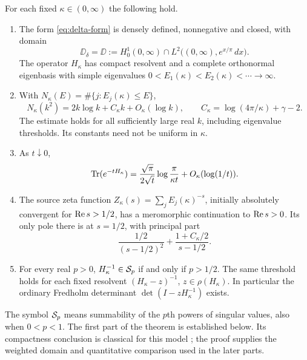 \begin{theorem}
\label{thm:finite}
For each fixed $\kappa\in(0,\infty)$ the following hold.
\begin{enumerate}
\item The form \eqref{eq:delta-form} is densely defined, nonnegative
and closed, with domain
\begin{equation}
\DD_\delta=\DD:=
H^1_0(0,\infty)\cap L^2\bigl((0,\infty),e^{x/\pi}\,dx\bigr).
\label{eq:weighted-domain}
\end{equation}
The operator $H_\kappa$ has compact resolvent and a complete
orthonormal eigenbasis with simple eigenvalues
$0<E_1(\kappa)<E_2(\kappa)<\cdots\to\infty$.
\item With $N_\kappa(E)=\#\{j:E_j(\kappa)\le E\}$,
\begin{equation}
N_\kappa(k^2)=2k\log k+C_\kappa k+O_\kappa(\log k),
\qquad C_\kappa=\log(4\pi/\kappa)+\gamma-2.
\label{eq:count-law}
\end{equation}
The estimate holds for all sufficiently large real $k$, including
eigenvalue thresholds. Its constants need not be uniform in $\kappa$.
\item As $t\downarrow0$,
\begin{equation}
\operatorname{Tr}(e^{-tH_\kappa})
=\frac{\sqrt\pi}{2\sqrt t}\log\frac{\pi}{\kappa t}
 +O_\kappa(\log(1/t)).
\label{eq:heat-law}
\end{equation}
\item The source zeta function
$Z_\kappa(s)=\sum_jE_j(\kappa)^{-s}$, initially absolutely
convergent for $\operatorname{Re} s>1/2$, has a meromorphic continuation
to $\operatorname{Re} s>0$. Its only pole there is at $s=1/2$, with
principal part
\begin{equation}
\frac{1/2}{(s-1/2)^2}+
\frac{1+C_\kappa/2}{s-1/2}.
\label{eq:zeta-principal}
\end{equation}
\item For every real $p>0$,
$H_\kappa^{-1}\in\mathcal{S}_p$ if and only if $p>1/2$.
The same threshold holds for each fixed resolvent
$(H_\kappa-z)^{-1}$, $z\in\rho(H_\kappa)$.
In particular the ordinary Fredholm determinant
$\det(I-zH_\kappa^{-1})$ exists.
\end{enumerate}
\end{theorem}

The symbol $\mathcal{S}_p$ means summability of the $p$th powers of
singular values, also when $0<p<1$.
The first part of the theorem is established below. Its
compactness conclusion is classical for this model
\citep{egger2011infinite}; the proof supplies the weighted domain
and quantitative comparison used in the later parts.

